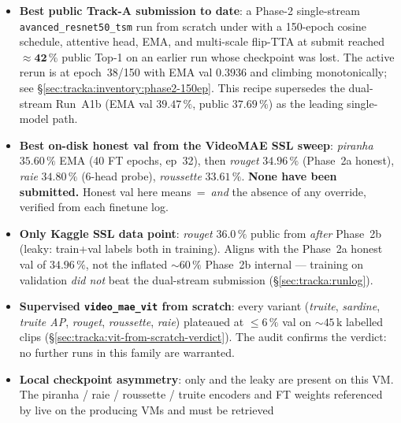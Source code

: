 \begin{itemize}[leftmargin=2em]
\item \textbf{Best public Track-A submission to date}: a Phase-2
   single-stream \texttt{avanced\_resnet50\_tsm} run from scratch under
    with a 150-epoch
   cosine schedule, attentive head, EMA, and multi-scale flip-TTA at
   submit reached \(\mathbf{\approx 42\,\%}\) public Top-1 on an earlier
   run whose checkpoint was lost.  The active rerun
   is at epoch~38/150 with EMA val \(0.3936\) and climbing monotonically;
   see \S\ref{sec:tracka:inventory:phase2-150ep}.  This recipe supersedes
   the dual-stream Run~A1b (EMA val \(39.47\,\%\), public \(37.69\,\%\))
   as the leading single-model path.
\item \textbf{Best on-disk honest val from the VideoMAE SSL sweep}:
   \emph{piranha} \(\mathbf{35.60\,\%}\) EMA (40 FT epochs, ep~32), then
   \emph{rouget} \(34.96\,\%\) (Phase~2a honest), \emph{raie}
   \(34.80\,\%\) (6-head probe), \emph{roussette} \(33.61\,\%\). \textbf{None
   have been submitted.}  Honest val here means
   \,=\, \emph{and} the
   absence of any  override,
   verified from each finetune log.
\item \textbf{Only Kaggle SSL data point}: \emph{rouget} \(36.0\,\%\)
   public from  \emph{after} Phase~2b
   (leaky: train+val labels both in training).  Aligns with the Phase~2a
   honest val of \(34.96\,\%\), not the inflated \(\sim 60\,\%\) Phase~2b
   internal --- training on validation \emph{did not} beat the dual-stream
   submission (\S\ref{sec:tracka:runlog}).
\item \textbf{Supervised \texttt{video\_mae\_vit} from scratch}: every
   variant (\emph{truite}, \emph{sardine}, \emph{truite AP},
   \emph{rouget}, \emph{roussette}, \emph{raie}) plateaued at
   \(\le 6\,\%\) val on \(\sim 45\,\)k labelled clips
   (\S\ref{sec:tracka:vit-from-scratch-verdict}).  The audit confirms the
   verdict: no further runs in this family are warranted.
\item \textbf{Local checkpoint asymmetry}: only
    and the leaky
    are present on this VM.  The piranha / raie /
   roussette / truite encoders and FT weights referenced by
    live on the producing VMs and must be retrieved

\end{itemize}

